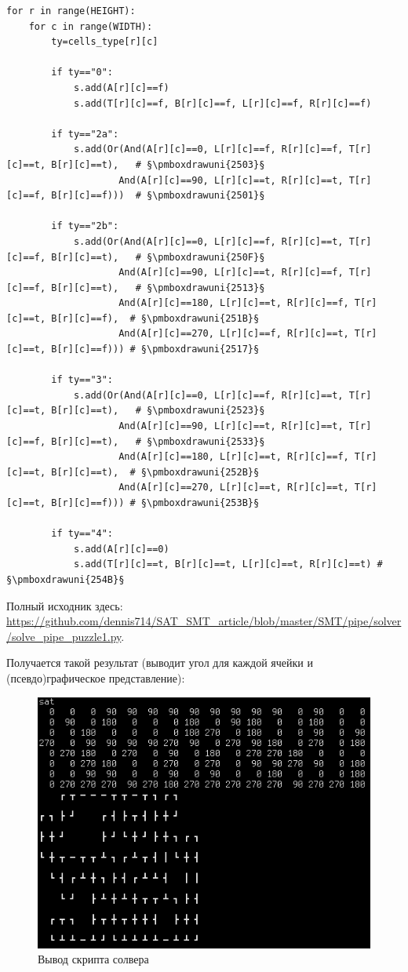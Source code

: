 \begin{lstlisting}
for r in range(HEIGHT):
    for c in range(WIDTH):
        ty=cells_type[r][c]

        if ty=="0":
            s.add(A[r][c]==f)
            s.add(T[r][c]==f, B[r][c]==f, L[r][c]==f, R[r][c]==f)

        if ty=="2a":
            s.add(Or(And(A[r][c]==0, L[r][c]==f, R[r][c]==f, T[r][c]==t, B[r][c]==t),   # §\pmboxdrawuni{2503}§
                    And(A[r][c]==90, L[r][c]==t, R[r][c]==t, T[r][c]==f, B[r][c]==f)))  # §\pmboxdrawuni{2501}§

        if ty=="2b":
            s.add(Or(And(A[r][c]==0, L[r][c]==f, R[r][c]==t, T[r][c]==f, B[r][c]==t),   # §\pmboxdrawuni{250F}§
                    And(A[r][c]==90, L[r][c]==t, R[r][c]==f, T[r][c]==f, B[r][c]==t),   # §\pmboxdrawuni{2513}§
                    And(A[r][c]==180, L[r][c]==t, R[r][c]==f, T[r][c]==t, B[r][c]==f),  # §\pmboxdrawuni{251B}§
                    And(A[r][c]==270, L[r][c]==f, R[r][c]==t, T[r][c]==t, B[r][c]==f))) # §\pmboxdrawuni{2517}§
	
        if ty=="3":
            s.add(Or(And(A[r][c]==0, L[r][c]==f, R[r][c]==t, T[r][c]==t, B[r][c]==t),   # §\pmboxdrawuni{2523}§
                    And(A[r][c]==90, L[r][c]==t, R[r][c]==t, T[r][c]==f, B[r][c]==t),   # §\pmboxdrawuni{2533}§
                    And(A[r][c]==180, L[r][c]==t, R[r][c]==f, T[r][c]==t, B[r][c]==t),  # §\pmboxdrawuni{252B}§
                    And(A[r][c]==270, L[r][c]==t, R[r][c]==t, T[r][c]==t, B[r][c]==f))) # §\pmboxdrawuni{253B}§

        if ty=="4":
            s.add(A[r][c]==0)
            s.add(T[r][c]==t, B[r][c]==t, L[r][c]==t, R[r][c]==t) # §\pmboxdrawuni{254B}§
\end{lstlisting}

Полный исходник здесь: \url{https://github.com/dennis714/SAT_SMT_article/blob/master/SMT/pipe/solver/solve_pipe_puzzle1.py}.

Получается такой результат (выводит угол для каждой ячейки и (псевдо)графическое представление):

\begin{figure}[H]
\centering
\includegraphics[scale=0.75]{SMT/pipe/solver/solver.png}
\caption{Вывод скрипта солвера}
\end{figure}

